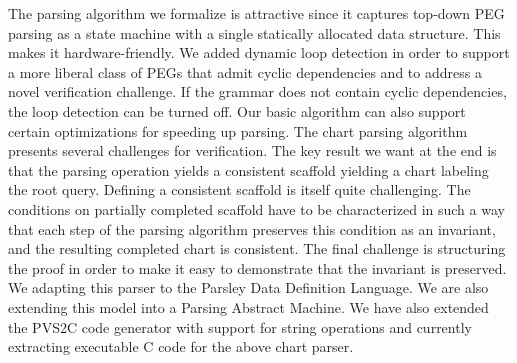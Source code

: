 The parsing algorithm we formalize is attractive since it captures
top-down PEG parsing as a state machine with a single statically
allocated data structure.  This makes it hardware-friendly.  We added
dynamic loop detection in order to support a more liberal class of 
PEGs that admit cyclic dependencies and to address a novel verification
challenge.  If the grammar does not contain cyclic dependencies, the
loop detection can be turned off.  Our basic
algorithm can also support certain optimizations for speeding up parsing.
The chart parsing algorithm presents several challenges for verification.
The key result we want at the end is that the parsing operation
yields a consistent scaffold yielding a chart labeling the root query.  Defining a consistent
scaffold is itself quite challenging.  The conditions on partially
completed scaffold have to be characterized in such a way that each step
of the parsing algorithm preserves this condition as an invariant, and
the resulting completed chart is consistent.  The final challenge is
structuring the proof in order to make it easy to demonstrate that the
invariant is preserved.  We adapting this parser to the Parsley Data Definition
Language.  We are also extending this model into a Parsing Abstract Machine.
We have also extended the PVS2C code generator with support for string operations
and currently extracting executable C code for the above chart parser. 
